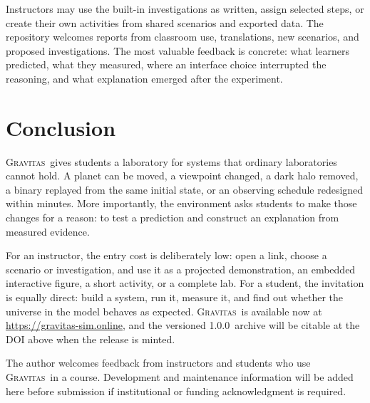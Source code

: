 \documentclass[twocolumn]{aastex631}
\newcommand{\Gravitas}{\textsc{Gravitas}}
\newcommand{\Version}{1.0.0}
\begin{document}
Instructors may use the built-in investigations as written, assign selected
steps, or create their own activities from shared scenarios and exported data.
The repository welcomes reports from classroom use, translations, new
scenarios, and proposed investigations. The most valuable feedback is concrete:
what learners predicted, what they measured, where an interface choice
interrupted the reasoning, and what explanation emerged after the experiment.

\section{Conclusion}
\label{sec:conclusion}

\Gravitas\ gives students a laboratory for systems that ordinary laboratories
cannot hold. A planet can be moved, a viewpoint changed, a dark halo removed, a
binary replayed from the same initial state, or an observing schedule redesigned
within minutes. More importantly, the environment asks students to make those
changes for a reason: to test a prediction and construct an explanation from
measured evidence.

For an instructor, the entry cost is deliberately low: open a link, choose a
scenario or investigation, and use it as a projected demonstration, an embedded
interactive figure, a short activity, or a complete lab. For a student, the
invitation is equally direct: build a system, run it, measure it, and find out
whether the universe in the model behaves as expected. \Gravitas\ is available
now at \url{https://gravitas-sim.online}, and the versioned \Version\ archive
will be citable at the DOI above when the release is minted.

\begin{acknowledgments}
The author welcomes feedback from instructors and students who use \Gravitas\
in a course. Development and maintenance information will be added here before
submission if institutional or funding acknowledgment is required.
\end{acknowledgments}

\software{\Gravitas\ \citep{gravitas_zenodo}}



\end{document}
